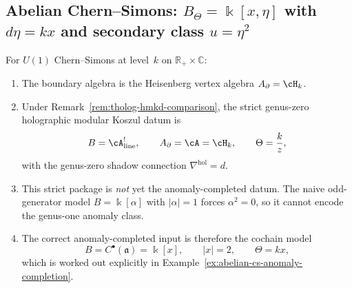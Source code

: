 \subsection{Abelian Chern--Simons: $B_\Theta = \Bbbk[x,\eta]$ with
$d\eta = kx$ and secondary class $u = \eta^2$}
\label{subsec:abelian-cs-example}

\begin{computation}
\label{comp:abelian-cs-strict-datum}
For $U(1)$ Chern--Simons at level~$k$ on
$\mathbb R_+\times\mathbb C$:
\begin{enumerate}[label=\textup{(\roman*)}]
\item The boundary algebra is the Heisenberg vertex algebra
 $A_\partial=\cH_k$.
\item Under Remark~\ref{rem:tholog-hmkd-comparison}, the strict
 genus-zero holographic modular Koszul datum is
 \[
 B=\cA^!_{\mathrm{line}},
 \qquad
 A_\partial=\cA=\cH_k,
 \qquad
 \Theta=\frac{k}{z},
 \]
 with the genus-zero shadow connection
 $\nabla^{\mathrm{hol}}=d$.
\item This strict package is \emph{not} yet the anomaly-completed
 datum. The naive odd-generator model
 $B=\Bbbk[\alpha]$ with $|\alpha|=1$ forces
 $\alpha^2=0$, so it cannot encode the genus-one anomaly class.
\item The correct anomaly-completed input is therefore the cochain
 model
 \[
 B=C^\bullet(\mathfrak a)=\Bbbk[x],
 \qquad
 |x|=2,
 \qquad
 \Theta=kx,
 \]
 which is worked out explicitly in
 Example~\ref{ex:abelian-cs-anomaly-completion}.
\end{enumerate}
\end{computation}

